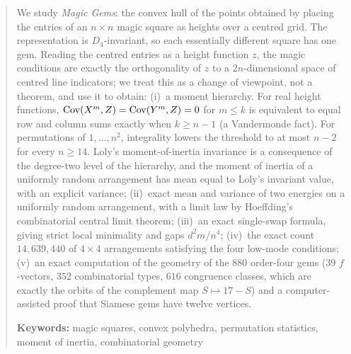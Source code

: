 \begin{abstract}
We study \emph{Magic Gems}: the convex hull of the points obtained by placing the entries of an $n\times n$ magic square as heights over a centred grid.
The representation is $D_4$-invariant, so each essentially different square has one gem.
Reading the centred entries as a height function $z$, the magic conditions are exactly the orthogonality of $z$ to a $2n$-dimensional space of centred line indicators; we treat this as a change of viewpoint, not a theorem, and use it to obtain:
(i)~a moment hierarchy. For real height functions, $\Cov(X^m,Z)=\Cov(Y^m,Z)=0$ for $m\le k$ is equivalent to equal row and column sums exactly when $k\ge n-1$ (a Vandermonde fact). For permutations of $1,\dots,n^2$, integrality lowers the threshold to at most $n-2$ for every $n\ge14$. Loly's moment-of-inertia invariance is a consequence of the degree-two level of the hierarchy, and the moment of inertia of a uniformly random arrangement has mean equal to Loly's invariant value, with an explicit variance;
(ii)~exact mean and variance of two energies on a uniformly random arrangement, with a limit law by Hoeffding's combinatorial central limit theorem;
(iii)~an exact single-swap formula, giving strict local minimality and gaps $d^2m/n^4$;
(iv)~the exact count $14{,}639{,}440$ of $4\times4$ arrangements satisfying the four low-mode conditions;
(v)~an exact computation of the geometry of the $880$ order-four gems ($39$ $f$-vectors, $352$ combinatorial types, $616$ congruence classes, which are exactly the orbits of the complement map $S\mapsto17-S$) and a computer-assisted proof that Siamese gems have twelve vertices.

\medskip
\noindent\textbf{Keywords:} magic squares, convex polyhedra, permutation statistics, moment of inertia, combinatorial geometry
\end{abstract}
